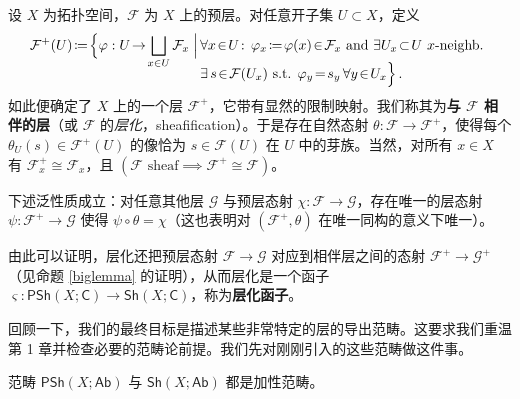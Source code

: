 \begin{Def}\label{asssheaf}
设 $X$ 为拓扑空间，$\mathcal{F}$ 为 $X$ 上的预层。对任意开子集 $U\subset X$，定义
\begin{align}
	\mathcal{F}^+(U)\!\coloneqq\!\Big\{\varphi:U\!\rightarrow\!\bigsqcup_{x\in U}\mathcal{F}_x \Bigm|\, &\forall x\!\in\! U\!:\,\varphi_x\!\coloneqq\!\varphi(x)\!\in\!\mathcal{F}_x\text{ and }\exists U_x\!\subset\! U\text{ $x$-neighb. } \nonumber\\[-0.3cm]
	&\exists\, s\!\in\!\mathcal{F}(U_x)\text{ s.t. }\varphi_y\!=\!s_y\,\forall y\!\in\! U_x\Big\}\,.
\end{align}
如此便确定了 $X$ 上的一个层 $\mathcal{F}^+$，它带有显然的限制映射。我们称其为\textbf{与 $\mathcal{F}$ 相伴的层}（或 $\mathcal{F}$ 的\textit{层化}，sheafification）。于是存在自然态射 $\theta:\mathcal{F}\rightarrow\mathcal{F}^+$，使得每个 $\theta_U(s)\in\mathcal{F}^+(U)$ 的像恰为 $s\in\mathcal{F}(U)$ 在 $U$ 中的芽族。当然，对所有 $x\in X$ 有 $\mathcal{F}^+_x\cong\mathcal{F}_x$，且 $(\mathcal{F}\text{ sheaf}\implies\mathcal{F}^+\cong\mathcal{F})$。

下述泛性质成立：对任意其他层 $\mathcal{G}$ 与预层态射 $\chi:\mathcal{F}\rightarrow\mathcal{G}$，存在唯一的层态射 $\psi:\mathcal{F}^+\rightarrow\mathcal{G}$ 使得 $\psi\circ\theta=\chi$（这也表明对 $(\mathcal{F}^+,\theta)$ 在唯一同构的意义下唯一）。

由此可以证明，层化还把预层态射 $\mathcal{F}\rightarrow\mathcal{G}$ 对应到相伴层之间的态射 $\mathcal{F}^+\rightarrow\mathcal{G}^+$（见命题 \ref{biglemma} 的证明），从而层化是一个函子 $\varsigma:\mathsf{PSh}(X;\mathsf{C})\rightarrow\mathsf{Sh}(X;\mathsf{C})$，称为\textbf{层化函子}。
\end{Def}

回顾一下，我们的最终目标是描述某些非常特定的层的导出范畴。这要求我们重温第 1 章并检查必要的范畴论前提。我们先对刚刚引入的这些范畴做这件事。

\begin{Pro}\label{pre-/sheafcatadditive}
范畴 $\mathsf{PSh}(X;\mathsf{Ab})$ 与 $\mathsf{Sh}(X;\mathsf{Ab})$ 都是加性范畴。
\end{Pro}

